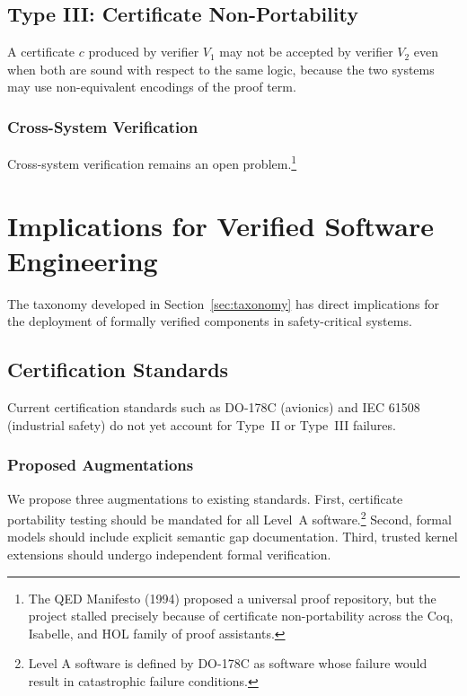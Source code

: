 \documentclass[twocolumn,12pt]{article}
\begin{document}
\lipsum[8]

\subsection{Type III: Certificate Non-Portability}
\label{sec:type3}

A certificate $c$ produced by verifier $V_1$ may not be accepted by verifier
$V_2$ even when both are sound with respect to the same logic, because the
two systems may use non-equivalent encodings of the proof term.
\lipsum[9]

\subsubsection{Cross-System Verification}

Cross-system verification remains an open problem.\footnote{The QED Manifesto
(1994) proposed a universal proof repository, but the project stalled
precisely because of certificate non-portability across the Coq, Isabelle,
and HOL family of proof assistants.}
\lipsum[10]

\section{Implications for Verified Software Engineering}
\label{sec:implications}

The taxonomy developed in Section~\ref{sec:taxonomy} has direct implications
for the deployment of formally verified components in safety-critical systems.

\subsection{Certification Standards}

Current certification standards such as DO-178C (avionics) and IEC 61508
(industrial safety) do not yet account for Type~II or Type~III failures.
\lipsum[11]

\subsubsection{Proposed Augmentations}

We propose three augmentations to existing standards.
First, certificate portability testing should be mandated for all Level~A
software.\footnote{Level A software is defined by DO-178C as software whose
failure would result in catastrophic failure conditions.}
Second, formal models should include explicit semantic gap documentation.
Third, trusted kernel extensions should undergo independent formal verification.
\end{document}

